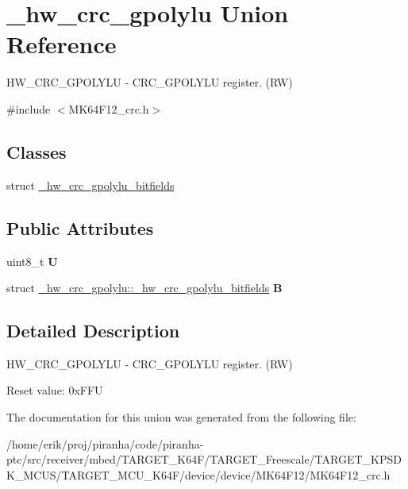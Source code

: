 \hypertarget{union__hw__crc__gpolylu}{}\section{\+\_\+hw\+\_\+crc\+\_\+gpolylu Union Reference}
\label{union__hw__crc__gpolylu}


H\+W\+\_\+\+C\+R\+C\+\_\+\+G\+P\+O\+L\+Y\+LU -\/ C\+R\+C\+\_\+\+G\+P\+O\+L\+Y\+LU register. (RW)  




{\ttfamily \#include $<$M\+K64\+F12\+\_\+crc.\+h$>$}

\subsection*{Classes}
\begin{DoxyCompactItemize}
\item 
struct \hyperlink{struct__hw__crc__gpolylu_1_1__hw__crc__gpolylu__bitfields}{\+\_\+hw\+\_\+crc\+\_\+gpolylu\+\_\+bitfields}
\end{DoxyCompactItemize}
\subsection*{Public Attributes}
\begin{DoxyCompactItemize}
\item 
uint8\+\_\+t {\bfseries U}\hypertarget{union__hw__crc__gpolylu_ac2ac862d9d4fed28759c8d775964f966}{}\label{union__hw__crc__gpolylu_ac2ac862d9d4fed28759c8d775964f966}

\item 
struct \hyperlink{struct__hw__crc__gpolylu_1_1__hw__crc__gpolylu__bitfields}{\+\_\+hw\+\_\+crc\+\_\+gpolylu\+::\+\_\+hw\+\_\+crc\+\_\+gpolylu\+\_\+bitfields} {\bfseries B}\hypertarget{union__hw__crc__gpolylu_a258a95d0d0304c910bc0f179812b7a6b}{}\label{union__hw__crc__gpolylu_a258a95d0d0304c910bc0f179812b7a6b}

\end{DoxyCompactItemize}


\subsection{Detailed Description}
H\+W\+\_\+\+C\+R\+C\+\_\+\+G\+P\+O\+L\+Y\+LU -\/ C\+R\+C\+\_\+\+G\+P\+O\+L\+Y\+LU register. (RW) 

Reset value\+: 0x\+F\+FU 

The documentation for this union was generated from the following file\+:\begin{DoxyCompactItemize}
\item 
/home/erik/proj/piranha/code/piranha-\/ptc/src/receiver/mbed/\+T\+A\+R\+G\+E\+T\+\_\+\+K64\+F/\+T\+A\+R\+G\+E\+T\+\_\+\+Freescale/\+T\+A\+R\+G\+E\+T\+\_\+\+K\+P\+S\+D\+K\+\_\+\+M\+C\+U\+S/\+T\+A\+R\+G\+E\+T\+\_\+\+M\+C\+U\+\_\+\+K64\+F/device/device/\+M\+K64\+F12/M\+K64\+F12\+\_\+crc.\+h\end{DoxyCompactItemize}
